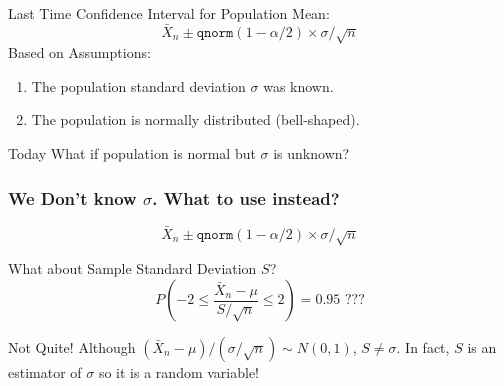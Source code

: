 \documentclass[handout]{beamer}
\date{Lecture 17}
\begin{document}
 





\begin{frame}[plain]
	\titlepage 
	

\end{frame} 





\begin{frame}
\begin{block}{Last Time}
Confidence Interval for Population Mean:
$$\boxed{\bar{X}_n \pm \texttt{qnorm}(1-\alpha/2) \times \sigma/\sqrt{n}}$$
Based on Assumptions:
	\begin{enumerate}
\item The population standard deviation $\sigma$ was known.
\item The population is normally distributed (bell-shaped).
\end{enumerate}
\end{block}
\begin{block}{Today}
What if population is normal but $\sigma$ is unknown?
\end{block}

\end{frame}
\begin{frame}
\frametitle{We Don't know $\sigma$. What to use instead?}
$$\boxed{\bar{X}_n \pm \texttt{qnorm}(1-\alpha/2) \times \sigma/\sqrt{n}}$$

\begin{block}{What about Sample Standard Deviation $S$?}
	$$P\left(-2 \leq \frac{\bar{X}_n-\mu}{S/\sqrt{n}} \leq 2 \right) = 0.95 \mbox{ ???}$$
\end{block}

\begin{block}{Not Quite!}
Although $(\bar{X}_n-\mu)/(\sigma/\sqrt{n})\sim N(0,1)$, $S \neq \sigma$. In fact, $S$ is an \alert{estimator} of $\sigma$ so it is a \alert{random variable!}
\end{block}
\end{frame}
\end{document}
